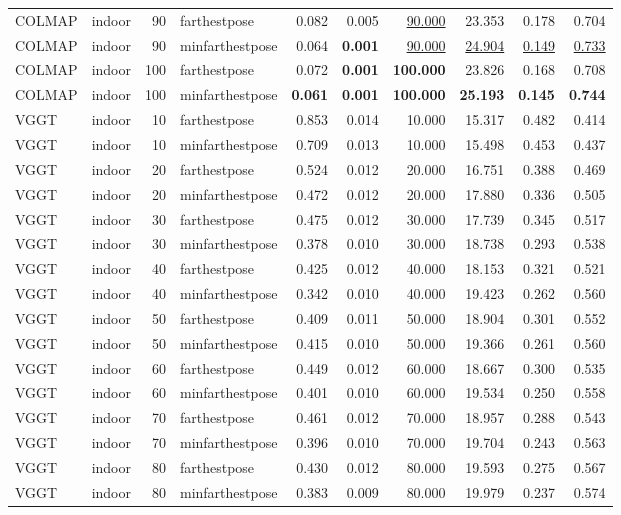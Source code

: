 \begin{table}[H]
\begin{tabular}{llrlrrrrrr}
COLMAP & indoor & 90 & farthestpose & 0.082 & 0.005 & \underline{90.000} & 23.353 & 0.178 & 0.704 \\
COLMAP & indoor & 90 & minfarthestpose & 0.064 & \textbf{0.001} & \underline{90.000} & \underline{24.904} & \underline{0.149} & \underline{0.733} \\
COLMAP & indoor & 100 & farthestpose & 0.072 & \textbf{0.001} & \textbf{100.000} & 23.826 & 0.168 & 0.708 \\
COLMAP & indoor & 100 & minfarthestpose & \textbf{0.061} & \textbf{0.001} & \textbf{100.000} & \textbf{25.193} & \textbf{0.145} & \textbf{0.744} \\
VGGT & indoor & 10 & farthestpose & 0.853 & 0.014 & 10.000 & 15.317 & 0.482 & 0.414 \\
VGGT & indoor & 10 & minfarthestpose & 0.709 & 0.013 & 10.000 & 15.498 & 0.453 & 0.437 \\
VGGT & indoor & 20 & farthestpose & 0.524 & 0.012 & 20.000 & 16.751 & 0.388 & 0.469 \\
VGGT & indoor & 20 & minfarthestpose & 0.472 & 0.012 & 20.000 & 17.880 & 0.336 & 0.505 \\
VGGT & indoor & 30 & farthestpose & 0.475 & 0.012 & 30.000 & 17.739 & 0.345 & 0.517 \\
VGGT & indoor & 30 & minfarthestpose & 0.378 & 0.010 & 30.000 & 18.738 & 0.293 & 0.538 \\
VGGT & indoor & 40 & farthestpose & 0.425 & 0.012 & 40.000 & 18.153 & 0.321 & 0.521 \\
VGGT & indoor & 40 & minfarthestpose & 0.342 & 0.010 & 40.000 & 19.423 & 0.262 & 0.560 \\
VGGT & indoor & 50 & farthestpose & 0.409 & 0.011 & 50.000 & 18.904 & 0.301 & 0.552 \\
VGGT & indoor & 50 & minfarthestpose & 0.415 & 0.010 & 50.000 & 19.366 & 0.261 & 0.560 \\
VGGT & indoor & 60 & farthestpose & 0.449 & 0.012 & 60.000 & 18.667 & 0.300 & 0.535 \\
VGGT & indoor & 60 & minfarthestpose & 0.401 & 0.010 & 60.000 & 19.534 & 0.250 & 0.558 \\
VGGT & indoor & 70 & farthestpose & 0.461 & 0.012 & 70.000 & 18.957 & 0.288 & 0.543 \\
VGGT & indoor & 70 & minfarthestpose & 0.396 & 0.010 & 70.000 & 19.704 & 0.243 & 0.563 \\
VGGT & indoor & 80 & farthestpose & 0.430 & 0.012 & 80.000 & 19.593 & 0.275 & 0.567 \\
VGGT & indoor & 80 & minfarthestpose & 0.383 & 0.009 & 80.000 & 19.979 & 0.237 & 0.574 \\

\end{tabular}
\end{table}
